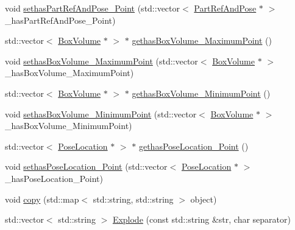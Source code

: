 \begin{DoxyCompactItemize}
\item 
void \hyperlink{class_point_aeea2f9fec03d12f85474fe6da42e50ac}{sethasPartRefAndPose\_\-Point} (std::vector$<$ \hyperlink{class_part_ref_and_pose}{PartRefAndPose} $\ast$ $>$ \_\-hasPartRefAndPose\_\-Point)
\item 
std::vector$<$ \hyperlink{class_box_volume}{BoxVolume} $\ast$ $>$ $\ast$ \hyperlink{class_point_a358c1e5af29fc985c71a59ad3500f2a4}{gethasBoxVolume\_\-MaximumPoint} ()
\item 
void \hyperlink{class_point_a7dbca942721008b5dfd096478696f2ad}{sethasBoxVolume\_\-MaximumPoint} (std::vector$<$ \hyperlink{class_box_volume}{BoxVolume} $\ast$ $>$ \_\-hasBoxVolume\_\-MaximumPoint)
\item 
std::vector$<$ \hyperlink{class_box_volume}{BoxVolume} $\ast$ $>$ $\ast$ \hyperlink{class_point_abe378e8940664a5da86946b0432792de}{gethasBoxVolume\_\-MinimumPoint} ()
\item 
void \hyperlink{class_point_ad52f3244c1900a3ac43b4b955f0ebf89}{sethasBoxVolume\_\-MinimumPoint} (std::vector$<$ \hyperlink{class_box_volume}{BoxVolume} $\ast$ $>$ \_\-hasBoxVolume\_\-MinimumPoint)
\item 
std::vector$<$ \hyperlink{class_pose_location}{PoseLocation} $\ast$ $>$ $\ast$ \hyperlink{class_point_a0e0b8b01f78d0a09061aa92b93b8d2ef}{gethasPoseLocation\_\-Point} ()
\item 
void \hyperlink{class_point_a7070569319a6bd6569faf518cb9b117b}{sethasPoseLocation\_\-Point} (std::vector$<$ \hyperlink{class_pose_location}{PoseLocation} $\ast$ $>$ \_\-hasPoseLocation\_\-Point)
\item 
void \hyperlink{class_point_a46b2c683edf3223af06704fbc5da12b8}{copy} (std::map$<$ std::string, std::string $>$ object)
\item 
std::vector$<$ std::string $>$ \hyperlink{class_point_a1ddaf9ed9023f8aff7ea10e1c7ef5fe9}{Explode} (const std::string \&str, char separator)
\end{DoxyCompactItemize}



